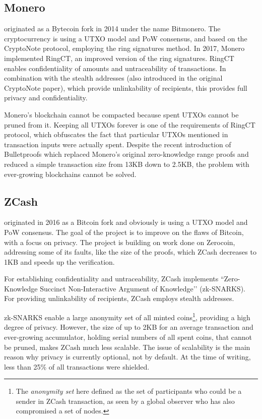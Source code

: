 \documentclass[8pt,fleqn,openany]{book}
\begin{document}
\subsection{Monero} originated as a Bytecoin fork in 2014 under the name Bitmonero. The cryptocurrency is using a UTXO model and PoW consensus, and based on the CryptoNote protocol\cite{c2}, employing the ring signatures method. In 2017, Monero implemented RingCT\cite{c3}, an improved version of the ring signatures. RingCT enables confidentiality of amounts and untraceability of transactions. In combination with the stealth addresses (also introduced in the original CryptoNote paper), which provide unlinkability of recipients, this provides full privacy and confidentiality.

Monero’s blockchain cannot be compacted because spent UTXOs cannot be pruned from it. Keeping all UTXOs forever is one of the requirements of RingCT protocol, which obfuscates the fact that particular UTXOs mentioned in transaction inputs were actually spent. 
Despite the recent introduction of Bulletproofs\cite{c4} which replaced Monero’s original zero-knowledge range proofs and reduced a simple transaction size from 13KB down to 2.5KB, the problem with ever-growing blockchains cannot be solved. 

\subsection{ZCash} originated in 2016 as a Bitcoin fork and obviously is using a UTXO model and PoW consensus. The goal of the project is to improve on the flaws of Bitcoin, with a focus on privacy. The project is building on work done on Zerocoin\cite{c5}, addressing some of its faults, like the size of the proofs, which ZCash decreases to 1KB and speeds up the verification.

For establishing confidentiality and untraceability, ZCash implements ``Zero-Knowledge Succinct Non-Interactive Argument of Knowledge’’ (zk-SNARKS)\cite{c6}. For providing unlinkability of recipients, ZCash employs stealth addresses.

zk-SNARKS enable a large anonymity set of all minted coins\footnote{The \textit{anonymity set} here defined as the set of participants who could be a sender in ZCash transaction, as seen by a global observer who has also compromised a set of nodes.}, providing a high degree of privacy. However, the size of up to 2KB for an average transaction and ever-growing accumulator, holding serial numbers of all spent coins, that cannot be pruned, makes ZCash much less scalable. The issue of scalability is the main reason why privacy is currently optional, not by default. At the time of writing, less than 25\% of all transactions were shielded.
\end{document}

